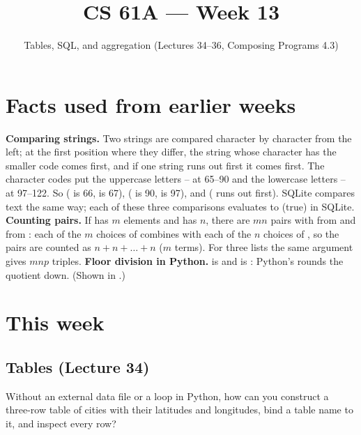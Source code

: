 \documentclass[10pt]{scrartcl}
\title{CS 61A --- Week 13}
\subtitle{Tables, SQL, and aggregation (Lectures 34--36, Composing Programs 4.3)}
\author{}\date{}\ihead{}
\begin{document}
\maketitle

\section{Facts used from earlier weeks}
\begin{enumerate}[label=(W\arabic*),leftmargin=2.8em,itemsep=4pt]
  \ii {}\textbf{Comparing strings.} Two strings are compared character by character from the left; at the first position where they differ, the string whose character has the smaller code comes first, and if one string runs out first it comes first. The character codes put the uppercase letters -- at 65--90 and the lowercase letters -- at 97--122. So  ( is 66,  is 67),  ( is 90,  is 97), and  ( runs out first). SQLite compares text the same way; each of these three comparisons evaluates to  (true) in SQLite.
  \ii {}\textbf{Counting pairs.} If  has $m$ elements and  has $n$, there are $mn$ pairs  with  from  and  from : each of the $m$ choices of  combines with each of the $n$ choices of , so the pairs are counted as $n + n + \dots + n$ ($m$ terms). For three lists the same argument gives $mnp$ triples.
  \ii {}\textbf{Floor division in Python.}  is  and  is : Python's \cd{//} rounds the quotient down. (Shown in .)
\end{enumerate}

\section{This week}

\subsection{Tables (Lecture 34)}

\begin{qbox}
  Without an external data file or a loop in Python, how can you construct a three-row table of cities with their latitudes and longitudes, bind a table name to it, and inspect every row?
\end{qbox}
\end{document}
